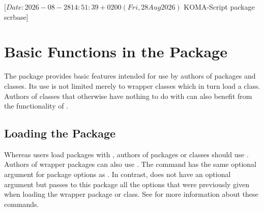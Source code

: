 %
%
%
%
%
%
%

                 [$Date: 2026-08-28 14:51:39 +0200 (Fri, 28 Aug 2026) $
                  KOMA-Script package scrbase]

\chapter{Basic Functions in the  Package}
\BeginIndexGroup
{}%

The  package provides basic features intended for use by
authors of packages and classes. Its use is not limited merely to wrapper
classes which in turn load a \KOMAScript{} class. Authors of classes that
otherwise have nothing to do with \KOMAScript{} can also benefit from the
functionality of .

\section{Loading the Package}

Whereas users load packages with , authors of packages or
classes should use . Authors of
wrapper packages can also use . The
 command has the same optional argument for package
options as . In contrast, 
does not have an optional argument but passes to this package all the options
that were previously given when loading the wrapper package or class. See
\cite{latex:clsguide} for more information about these commands.


